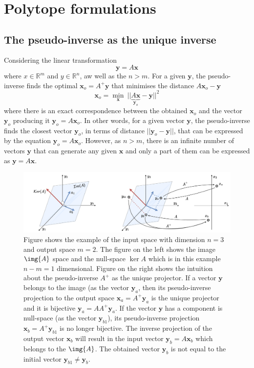 \chapter{Polytope formulations}

\section{The pseudo-inverse as the unique inverse} 
\label{ch:pseudoinverse_unique}

Considering the linear transformation 
\begin{equation}
    \bm{y} = A\bm{x}
\end{equation}
where $x\in\mathbb{R}^m$ and  $y\in\mathbb{R}^n$, aw well as the $n>m$.  For a given $\bm{y}$, the pseudo-inverse finds the optimal $\bm{x}_o=A^+\bm{y}$ that minimises the distance $A\bm{x}_o-\bm{y}$
\begin{equation}
    \bm{x}_o = \min_{\bm{x}} ~|| \underbrace{A\bm{x}}_{\bm{y}_o} - \bm{y}||^2 
    \label{eq:pseudoinverse_opt}
\end{equation}
where there is an exact correspondence between the obtained $\bm{x}_o$ and the vector $\bm{y}_o$ producing it $\bm{y}_o=A\bm{x}_o$.
In other words, for a given vector $\bm{y}$, the pseudo-inverse finds the closest vector $\bm{y}_o$, in terms of distance $||\bm{y}_o-\bm{y}||$, that can be expressed by the equation $\bm{y}_o=A\bm{x}_o$. However, as $n>m$, there is an infinite number of vectors $\bm{y}$ that can generate any given $\bm{x}$ and only a part of them can be expressed as $\bm{y}=A\bm{x}$.

\begin{figure}
    \centering
    \includegraphics[width=\linewidth]{Chapters/imgs/pseudo_inverse_intuition_aio.pdf}
    \caption{Figure shows the example of the input space with dimension $n=3$ and output space $m=2$. The figure on the left shows the image $\img{A}$ space and the null-space $\ker{A}$ which is in this example $n-m=1$ dimensional. Figure on the right shows the intuition about the pseudo-inverse $A^+$ as the unique projector. If a vector $\bm{y}$ belongs to the image (as the vector $\bm{y}_a$, then its pseudo-inverse projection to the output space $\bm{x}_a=A^+\bm{y}_a$ is the unique projector and it is bijective $\bm{y}_a = AA^+\bm{y}_a$. If the vector $\bm{y}$ has a component is null-space (as the vector $\bm{y}_{b1}$), its pseudo-inverse projection  $\bm{x}_b=A^+\bm{y}_{b1}$ is no longer bijective. The inverse projection of the output vector $\bm{x}_b$ will result in the input vector $\bm{y}_b=A\bm{x}_b$ which belongs to the $\img{A}$. The obtained vector $\bm{y}_b$ is not equal to the initial vector $\bm{y}_{b1}\neq \bm{y}_b$.}
    \label{fig:pseudoinverse_intuition}
\end{figure}

